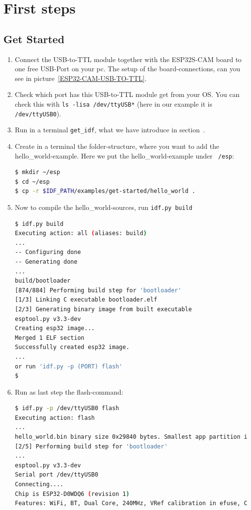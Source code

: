 \graphicspath{ {./first_steps/pictures/} }
\section{First steps}
\subsection{Get Started}
\begin{enumerate}
\item Connect the USB-to-TTL module together with the ESP32S-CAM board  to one free USB-Port on your pc. The setup of the board-connections, can you see in picture~\ref{ESP32-CAM-USB-TO-TTL}.
\item Check which port has this USB-to-TTL module get from your OS. You can check this with \texttt{ls -lisa /dev/ttyUSB*} (here in our example it is \texttt{/dev/ttyUSB0}).
\item Run in a terminal \texttt{get\_idf}, what we have introduce in section~.
\item Create in a terminal the folder-structure, where you want to add the hello\_world-example. Here we put the hello\_world-example under \texttt{~/esp}:
\begin{lstlisting}[language=bash]
$ mkdir ~/esp
$ cd ~/esp
$ cp -r $IDF_PATH/examples/get-started/hello_world . 
\end{lstlisting} 
\item Now to compile the hello\_world-sources, run \texttt{idf.py build}
\begin{lstlisting}[language=bash]
$ idf.py build
Executing action: all (aliases: build)
...
-- Configuring done
-- Generating done
...
build/bootloader
[874/884] Performing build step for 'bootloader'
[1/3] Linking C executable bootloader.elf
[2/3] Generating binary image from built executable
esptool.py v3.3-dev
Creating esp32 image...
Merged 1 ELF section
Successfully created esp32 image.
...
or run 'idf.py -p (PORT) flash'
$
\end{lstlisting}
\item Run as last step the flash-command:
\begin{lstlisting}[language=bash]
$ idf.py -p /dev/ttyUSB0 flash 
Executing action: flash
...
hello_world.bin binary size 0x29840 bytes. Smallest app partition is 0x100000 bytes. 0xd67c0 bytes (84%) free.
[2/5] Performing build step for 'bootloader'
...
esptool.py v3.3-dev
Serial port /dev/ttyUSB0
Connecting....
Chip is ESP32-D0WDQ6 (revision 1)
Features: WiFi, BT, Dual Core, 240MHz, VRef calibration in efuse, Coding Scheme None

\end{lstlisting}
\end{enumerate}
